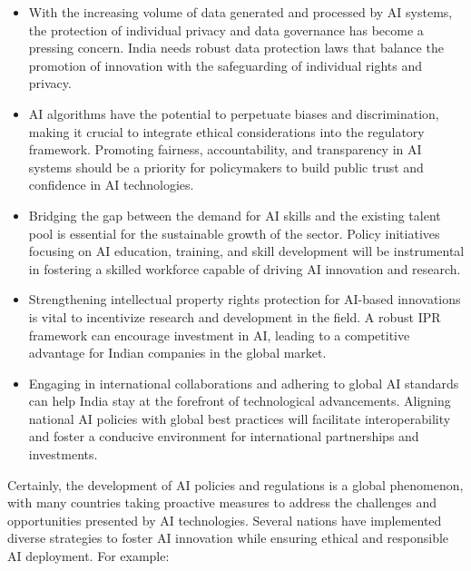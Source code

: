 \documentclass{report}
\begin{document}
\begin{itemize}
  \item With the increasing volume of data generated and processed by AI systems, 
        the protection of individual privacy and data governance has become a pressing concern. 
        India needs robust data protection laws that balance the promotion of innovation with the safeguarding of individual rights and privacy.
  \item AI algorithms have the potential to perpetuate biases and discrimination, 
        making it crucial to integrate ethical considerations into the regulatory framework. Promoting fairness, 
        accountability, and transparency in AI systems should be a priority for policymakers to build public 
        trust and confidence in AI technologies.
  \item Bridging the gap between the demand for AI skills and the existing 
        talent pool is essential for the sustainable growth of the sector. Policy initiatives focusing on 
        AI education, training, and skill development will be instrumental in fostering a skilled 
        workforce capable of driving AI innovation and research.
  \item Strengthening intellectual property rights protection 
        for AI-based innovations is vital to incentivize research and development in the field. A robust IPR 
        framework can encourage investment in AI, leading to a competitive advantage for Indian companies in the global market.
  \item Engaging in international collaborations and adhering to global 
        AI standards can help India stay at the forefront of technological advancements. Aligning national 
        AI policies with global best practices will facilitate interoperability and foster a conducive 
        environment for international partnerships and investments.

\end{itemize}



Certainly, the development of AI policies and regulations is a global phenomenon, 
with many countries taking proactive measures to address the challenges and opportunities 
presented by AI technologies. Several nations have implemented diverse strategies to foster 
AI innovation while ensuring ethical and responsible AI deployment. For example:
\end{document}
